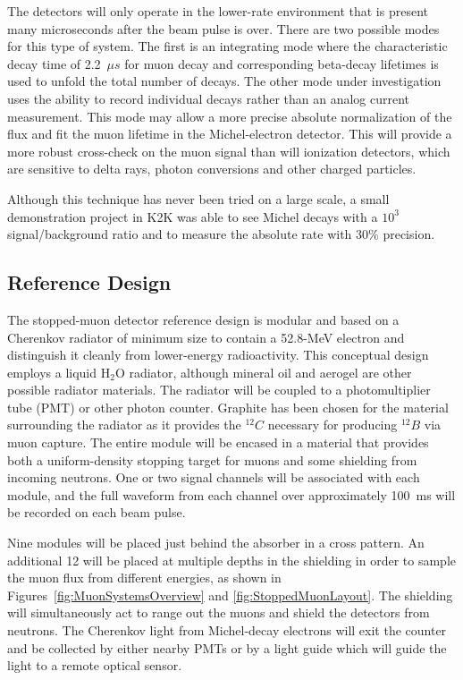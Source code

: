 The detectors will only operate in the lower-rate
environment that is present many microseconds after the beam pulse is
over. There are two possible modes for this type of system. 
The first is an integrating mode where the characteristic decay time of 
2.2~$\mu s$ for muon decay and corresponding beta-decay lifetimes is used to
unfold the total number of decays. The other mode under
investigation uses the ability to record individual decays rather
than an analog current measurement. This mode may allow a more precise absolute
normalization of the flux and fit the muon lifetime in the Michel-electron detector. 
This will provide a more robust cross-check on the
muon signal than will ionization detectors, which are sensitive to delta
rays, photon conversions and other charged particles.

Although this technique has never been tried on a large scale, a small
demonstration project in K2K was able to see Michel decays with a
$10^{3}$ signal/background ratio and to measure the absolute rate with
30\% precision\cite{ref:K2KMuDecayMon}.

\subsection{Reference Design}

The stopped-muon detector reference design
is modular and based on a Cherenkov radiator of
minimum size to contain a 52.8-MeV electron and distinguish it cleanly
from lower-energy radioactivity. This conceptual design employs
a liquid H$_2$O radiator, although mineral oil and aerogel are other
possible radiator materials. The radiator will be coupled to a photomultiplier tube (PMT) or
other photon counter. Graphite has been chosen for the material
surrounding the radiator as it provides the $^{12}C$ necessary for
producing $^{12}B$ via muon capture. The entire module will be
encased in a material that provides both a uniform-density stopping
target for muons and some shielding from incoming neutrons. One or two
signal channels will be associated with each module, and the full
waveform from each channel over approximately 100~ms will be recorded
on each beam pulse.

Nine modules will be placed just behind the absorber in a cross pattern.  An additional 12 will be 
placed at multiple depths in the
shielding in order to sample the muon flux
from different energies, as shown in Figures~\ref{fig:MuonSystemsOverview} and \ref{fig:StoppedMuonLayout}. 
The shielding will simultaneously act to range out the muons and shield the detectors from 
neutrons. The Cherenkov light from Michel-decay electrons will exit the 
counter and be collected by either nearby PMTs or by a light guide which will
guide the light to a remote optical sensor.  

